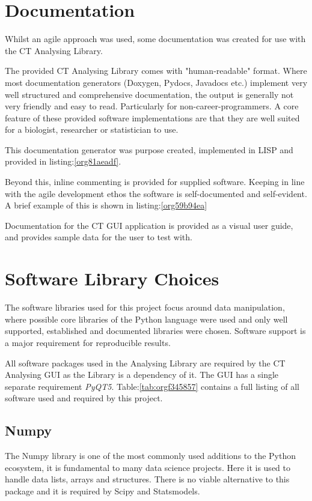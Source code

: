 \documentclass[11pt]{report}
\begin{document}
\section{Documentation}
\label{sec:org81f5b23}
Whilst an agile approach was used, some documentation was created for use with the CT Analysing Library.

The provided CT Analysing Library comes with "human-readable" format. Where most documentation generators (Doxygen, Pydocs, Javadocs etc.) implement very well structured and comprehensive documentation, the output is generally not very friendly and easy to read. Particularly for non-career-programmers. A core feature of these provided software implementations are that they are well suited for a biologist, researcher or statistician to use.

This documentation generator was purpose created, implemented in LISP and provided in listing:\ref{org81aeadf}.

Beyond this, inline commenting is provided for supplied software. Keeping in line with the agile development ethos the software is self-documented and self-evident. A brief example of this is shown in listing:\ref{org59b94ea}

Documentation for the CT GUI application is provided as a visual user guide, and provides sample data for the user to test with.
\section{Software Library Choices}
\label{sec:org300fde7}
The software libraries used for this project focus around data manipulation, where possible core libraries of the Python language were used and only well supported, established and documented libraries were chosen. Software support is a major requirement for reproducible results.

All software packages used in the Analysing Library are required by the CT Analysing GUI as the Library is a dependency of it. The GUI has a single separate requirement \emph{PyQT5}.
Table:\ref{tab:orgf345857} contains a full listing of all software used and required by this project.
\subsection{Numpy}
\label{sec:org60da15c}
The Numpy library is one of the most commonly used additions to the Python ecosystem, it is fundamental to many data science projects. Here it is used to handle data lists, arrays and structures. There is no viable alternative to this package and it is required by Scipy and Statsmodels.
\end{document}
